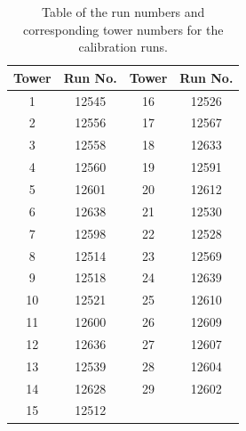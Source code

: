 \begin{table}[h]
\centering
	\begin{tabular}{ c c | c c }
	\hline \hline
	\textbf{Tower} & \textbf{Run No.} & \textbf{Tower} & \textbf{Run No.} \\ \hline \hline
	 1 & 12545 & 16 & 12526 \\
	 2 & 12556 & 17 & 12567 \\
	 3 & 12558 & 18 & 12633 \\
	 4 & 12560 & 19 & 12591 \\
	 5 & 12601 & 20 & 12612 \\
	 6 & 12638 & 21 & 12530 \\
	 7 & 12598 & 22 & 12528 \\
	 8 & 12514 & 23 & 12569 \\
	 9 & 12518 & 24 & 12639 \\
	10 & 12521 & 25 & 12610 \\
	11 & 12600 & 26 & 12609 \\
	12 & 12636 & 27 & 12607 \\
	13 & 12539 & 28 & 12604 \\
	14 & 12628 & 29 & 12602 \\
	15 & 12512 &    &    \\ \hline
	\end{tabular}
	\caption{Table of the run numbers and corresponding tower numbers for the calibration runs.}
	\label{table:idea/calibrationruns}
\end{table}


